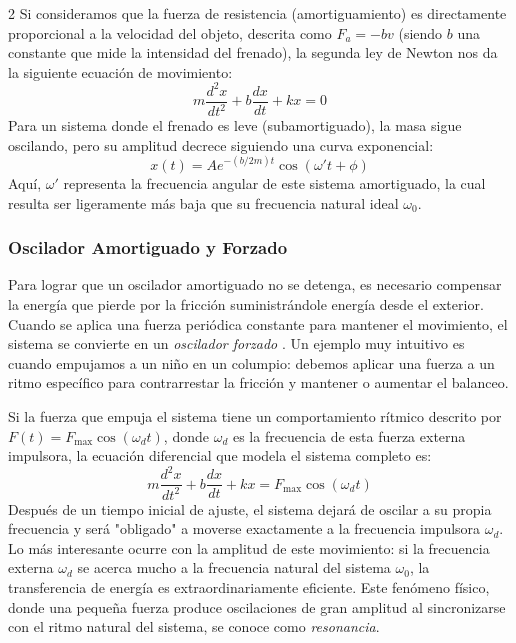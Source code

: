 \documentclass[10pt]{article}
\begin{document}
\begin{multicols}{2}
Si consideramos que la fuerza de resistencia (amortiguamiento) es directamente proporcional a la velocidad del objeto, descrita como $F_a = -bv$ (siendo $b$ una constante que mide la intensidad del frenado), la segunda ley de Newton nos da la siguiente ecuación de movimiento:
\begin{equation}
    m\frac{d^2x}{dt^2} + b\frac{dx}{dt} + kx = 0
\end{equation}
Para un sistema donde el frenado es leve (subamortiguado), la masa sigue oscilando, pero su amplitud decrece siguiendo una curva exponencial:
\begin{equation}
    x(t) = A e^{-(b/2m)t} \cos(\omega' t + \phi)
\end{equation}
Aquí, $\omega'$ representa la frecuencia angular de este sistema amortiguado, la cual resulta ser ligeramente más baja que su frecuencia natural ideal $\omega_0$.

\subsubsection{Oscilador Amortiguado y Forzado}
Para lograr que un oscilador amortiguado no se detenga, es necesario compensar la energía que pierde por la fricción suministrándole energía desde el exterior. Cuando se aplica una fuerza periódica constante para mantener el movimiento, el sistema se convierte en un \textit{oscilador forzado} \cite{sears_zemansky}. Un ejemplo muy intuitivo es cuando empujamos a un niño en un columpio: debemos aplicar una fuerza a un ritmo específico para contrarrestar la fricción y mantener o aumentar el balanceo.

Si la fuerza que empuja el sistema tiene un comportamiento rítmico descrito por $F(t) = F_{\text{max}} \cos(\omega_d t)$, donde $\omega_d$ es la frecuencia de esta fuerza externa impulsora, la ecuación diferencial que modela el sistema completo es:
\begin{equation}
    m\frac{d^2x}{dt^2} + b\frac{dx}{dt} + kx = F_{\text{max}} \cos(\omega_d t)
\end{equation}
Después de un tiempo inicial de ajuste, el sistema dejará de oscilar a su propia frecuencia y será "obligado" a moverse exactamente a la frecuencia impulsora $\omega_d$. Lo más interesante ocurre con la amplitud de este movimiento: si la frecuencia externa $\omega_d$ se acerca mucho a la frecuencia natural del sistema $\omega_0$, la transferencia de energía es extraordinariamente eficiente. Este fenómeno físico, donde una pequeña fuerza produce oscilaciones de gran amplitud al sincronizarse con el ritmo natural del sistema, se conoce como \textit{resonancia}.


\end{multicols}
\end{document}
